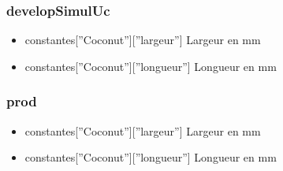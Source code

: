 \documentclass[letterpaper,10pt,french]{sphinxmanual}
\begin{document}
\begin{fulllineitems}
\label{profils:profils.develop.constantes.constantes}
\end{fulllineitems}



\subsubsection{developSimulUc}
\label{profils:developsimuluc}\label{profils:module-profils.developSimulUc.constantes}\begin{itemize}
\item {} 
constantes{[}''Coconut''{]}{[}''largeur''{]} Largeur en mm

\item {} 
constantes{[}''Coconut''{]}{[}''longueur''{]} Longueur en mm

\end{itemize}

\begin{fulllineitems}
\label{profils:profils.developSimulUc.constantes.constantes}
\end{fulllineitems}



\subsubsection{prod}
\label{profils:prod}\label{profils:module-profils.prod.constantes}\begin{itemize}
\item {} 
constantes{[}''Coconut''{]}{[}''largeur''{]} Largeur en mm

\item {} 
constantes{[}''Coconut''{]}{[}''longueur''{]} Longueur en mm

\end{itemize}

\begin{fulllineitems}
\label{profils:profils.prod.constantes.constantes}
\end{fulllineitems}
\end{document}

